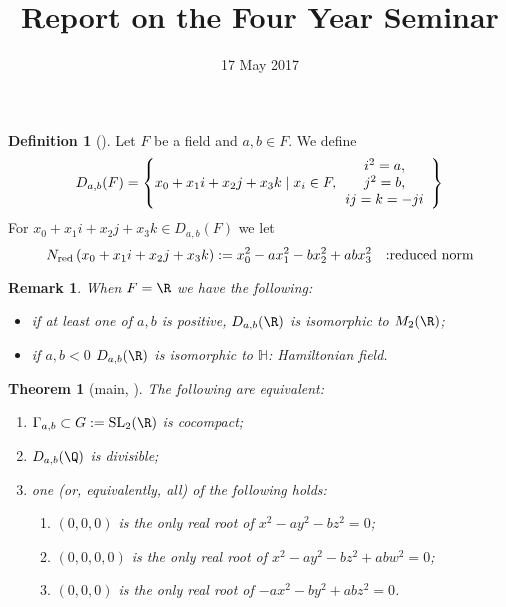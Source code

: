 \documentclass[a4paper,12pt]{article}
\title{Report on the Four Year Seminar}
\date{17 May 2017}
\newtheorem{theorem}{Theorem}
\newtheorem{remark}{Remark}
\theoremstyle{definition}
\newtheorem{definition}{Definition}
\begin{document}
\maketitle
\begin{definition}[{\cite[2.2]{bergeron2016spectrum}}]
	Let $F$ be a field and $a,b\in F$. We define\begin{equation*}
		D_{a,b}(F)=\left\{ x_0+x_1i+x_2j+x_3k\mid x_i\in F,\begin{array}[]{c}
		i^2=a,\\ j^2=b,\\ ij=k=-ji
	\end{array}\right\}
	\end{equation*}
	For $x_0+x_1i+x_2j+x_3k\in D_{a,b}(F)$ we let\begin{equation*}
		N_{\mbox{\scriptsize red}}\left(  x_0+x_1i+x_2j+x_3k\right):=x_0^2-ax_1^2-bx_2^2+abx_3^2\quad\mbox{:reduced norm}
	\end{equation*}
\end{definition}
\begin{remark}
	When $F=\R$ we have the following:\begin{itemize}
		\item if at least one of $a,b$ is positive, $D_{a,b}(\R)$ is isomorphic to $M_2(\R)$;
		\item if $a,b<0$ $D_{a,b}(\R)$ is isomorphic to $\mathbb{H}$: Hamiltonian field.
	\end{itemize}
\end{remark}
\begin{theorem}[main, {\cite[Thm. 2.3, 3.]{bergeron2016spectrum}}]
	The following are equivalent:
	\begin{enumerate}
		\item $\Gamma_{a,b}\subset G:=\mbox{\normalfont SL}_2(\R)$ is cocompact;\label{item1}
		\item $D_{a,b}(\Q)$ is divisible;\label{item2}
		\item one (or, equivalently, all) of the following holds:\label{item3}\begin{enumerate}
				\item $(0,0,0)$ is the only real root of $x^2-ay^2-bz^2=0$;\label{itema}
				\item $(0,0,0,0)$ is the only real root of $x^2-ay^2-bz^2+abw^2=0$; \label{itemb}
				\item $(0,0,0)$ is the only real root of $-ax^2-by^2+abz^2=0$.\label{itemc}
			\end{enumerate}
	\end{enumerate}
\end{theorem}
\end{document}
